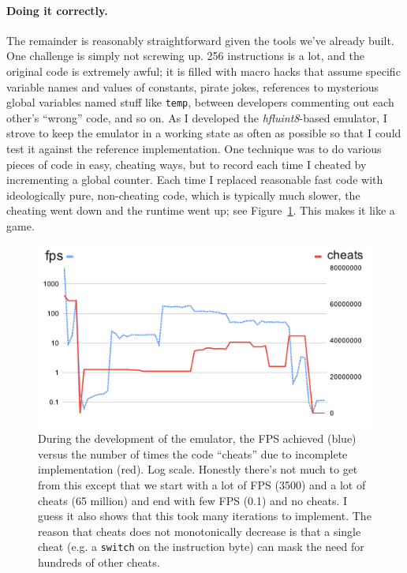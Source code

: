 \documentclass[twocolumn]{article}
\begin{document}
\paragraph{Doing it correctly.}
The remainder is reasonably straightforward given the tools we've already
built. One challenge is simply not screwing up. 256 instructions is a lot,
and the original code is extremely awful; it is filled with macro hacks
that assume specific variable names and values of constants, pirate jokes,
references to mysterious global variables named stuff like {\tt temp},
between developers commenting out each other's ``wrong'' code, and so on.
As I developed the {\it hfluint8}-based emulator, I strove to keep the
emulator in a working state as often as possible so that I could test it
against the reference implementation. One technique was to do various
pieces of code in easy, cheating ways, but to record each time I cheated
by incrementing a global counter. Each time I replaced reasonable fast
code with ideologically pure, non-cheating code, which is typically much slower,
the cheating went down and the runtime went up; see Figure~\ref{fig:cheating}.
This makes it like a game.

\begin{figure}[htp]
  \begin{center}
    \includegraphics[width=0.95 \linewidth]{fpscheats}
  \end{center}
  \caption{
    During the development of the emulator, the FPS achieved (blue) versus
    the number of times the code ``cheats'' due to incomplete implementation (red).
    Log scale. Honestly there's not much to get from this except that we start
    with a lot of FPS (3500) and a lot of cheats (65 million) and end with
    few FPS (0.1) and no cheats. I guess it also shows that this took many
    iterations to implement. The reason that cheats does not monotonically
    decrease is that a single cheat (e.g. a {\tt switch} on the instruction byte)
    can mask the need for hundreds of other cheats.
  } \label{fig:cheating}
\end{figure}
\end{document}
